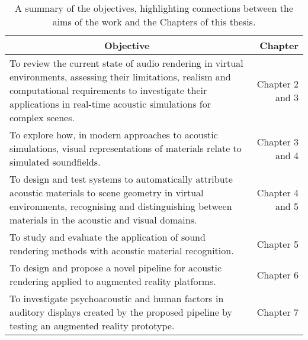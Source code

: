 \begin{table}[tbp]
  \centering
  \caption{A summary of the objectives, highlighting connections between the aims of the work and the Chapters of this thesis.}\label{tab:objectives-contributions}
    \begin{tabularx}{\linewidth}{Xr}
    \toprule
    \multicolumn{1}{c}{Objective} & Chapter \\ \midrule
    To review the current state of audio rendering in virtual environments, assessing their limitations, realism and computational requirements to  investigate their applications in real-time acoustic simulations for complex scenes.\newline &  Chapter 2 and 3 \\
    To explore how, in modern approaches to acoustic simulations, visual representations of materials relate to simulated soundfields.\newline & Chapter 3 and 4 \\
    To design and test systems to automatically attribute acoustic materials to scene geometry in virtual environments, recognising and distinguishing between materials in the acoustic and visual domains.\newline & Chapter 4 and 5 \\
    To study and evaluate the application of sound rendering methods with acoustic material recognition.\newline & Chapter 5 \\
    To design and propose a novel pipeline for acoustic rendering applied to augmented reality platforms.\newline & Chapter 6 \\
    To investigate psychoacoustic and human factors in auditory displays created by the proposed pipeline by testing an augmented reality prototype.\newline & Chapter 7 \\ \bottomrule
    \end{tabularx}
\end{table}